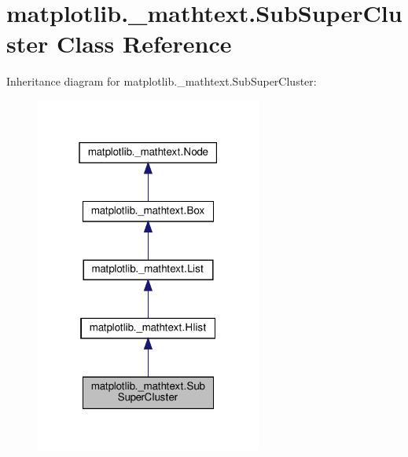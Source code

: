 \hypertarget{classmatplotlib_1_1__mathtext_1_1SubSuperCluster}{}\section{matplotlib.\+\_\+mathtext.\+Sub\+Super\+Cluster Class Reference}
\label{classmatplotlib_1_1__mathtext_1_1SubSuperCluster}


Inheritance diagram for matplotlib.\+\_\+mathtext.\+Sub\+Super\+Cluster\+:
\nopagebreak
\begin{figure}[H]
\begin{center}
\leavevmode
\includegraphics[width=211pt]{classmatplotlib_1_1__mathtext_1_1SubSuperCluster__inherit__graph}
\end{center}
\end{figure}


